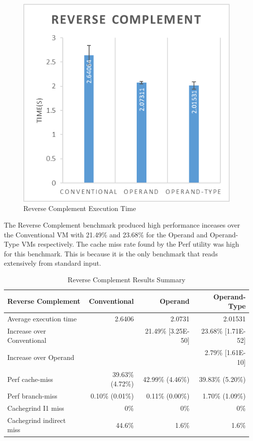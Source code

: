 \documentclass[english,a4paper,12pt]{report}
\begin{document}
\begin{figure}[!htb]
  \centering
  \includegraphics{reversecomplement.png}
  \caption{Reverse Complement Execution Time}
  \label{fig:reverse-time}
\end{figure}

The Reverse Complement benchmark produced high performance inceases
over the Conventional VM with 21.49\% and 23.68\% for the Operand and
Operand-Type VMs respectively. The cache miss rate found by the Perf
utility was high for this benchmark. This is because it is the only
benchmark that reads extensively from standard input. 

\begin{table}[!htb]
  \begin{center}
    \begin{tabular}{lrrr}
      Reverse Complement & Conventional & Operand & Operand-Type\\
      \hline
      Average execution time & 2.6406 & 2.0731 & 2.01531\\
      Increase over Conventional &  & 21.49\% [3.25E-50] & 23.68\% [1.71E-52]\\
      Increase over Operand &  &  & 2.79\% [1.61E-10]\\
      Perf cache-miss & 39.63\% (4.72\%) & 42.99\% (4.46\%) & 39.83\% (5.20\%)\\
      Perf branch-miss & 0.10\% (0.01\%) & 0.11\% (0.00\%) & 1.70\% (1.09\%)\\
      Cachegrind I1 miss & 0\% & 0\% & 0\%\\
      Cachegrind indirect miss & 44.6\% & 1.6\% & 1.6\%\\
    \end{tabular}
  \end{center}
  \caption{Reverse Complement Results Summary}
\end{table}
\end{document}
